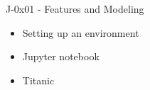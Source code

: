 \documentclass{article}
\begin{document}
\vspace{10mm}
\centerline{\Large J-0x01 - Features and Modeling}
\vspace{5mm}


\begin{itemize}
\item Setting up an environment
\item Jupyter notebook
\item Titanic
\end{itemize}
\end{document}
